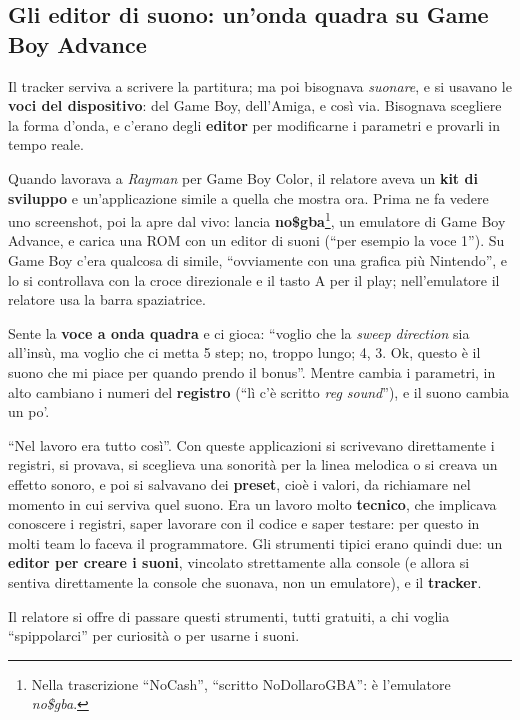 \subsection{Gli editor di suono: un'onda quadra su Game Boy Advance}

Il tracker serviva a scrivere la partitura; ma poi bisognava \emph{suonare}, e si
usavano le \textbf{voci del dispositivo}: del Game Boy, dell'Amiga, e così via.
Bisognava scegliere la forma d'onda, e c'erano degli \textbf{editor} per
modificarne i parametri e provarli in tempo reale.

Quando lavorava a \emph{Rayman} per Game Boy Color, il relatore aveva un
\textbf{kit di sviluppo} e un'applicazione simile a quella che mostra ora. Prima
ne fa vedere uno screenshot, poi la apre dal vivo: lancia
\textbf{no\$gba}\footnote{Nella trascrizione ``NoCash'', ``scritto NoDollaroGBA'':
è l'emulatore \emph{no\$gba}.}, un emulatore di Game Boy Advance, e carica una
ROM con un editor di suoni (``per esempio la voce 1''). Su Game Boy c'era
qualcosa di simile, ``ovviamente con una grafica più Nintendo'', e lo si
controllava con la croce direzionale e il tasto A per il play; nell'emulatore il
relatore usa la barra spaziatrice.

Sente la \textbf{voce a onda quadra} e ci gioca: ``voglio che la \emph{sweep
direction} sia all'insù, ma voglio che ci metta 5 step; no, troppo lungo; 4, 3.
Ok, questo è il suono che mi piace per quando prendo il bonus''. Mentre cambia i
parametri, in alto cambiano i numeri del \textbf{registro} (``lì c'è scritto
\emph{reg sound}''), e il suono cambia un po'.

``Nel lavoro era tutto così''. Con queste applicazioni si scrivevano direttamente
i registri, si provava, si sceglieva una sonorità per la linea melodica o si
creava un effetto sonoro, e poi si salvavano dei \textbf{preset}, cioè i valori,
da richiamare nel momento in cui serviva quel suono. Era un lavoro molto
\textbf{tecnico}, che implicava conoscere i registri, saper lavorare con il codice
e saper testare: per questo in molti team lo faceva il programmatore. Gli
strumenti tipici erano quindi due: un \textbf{editor per creare i suoni},
vincolato strettamente alla console (e allora si sentiva direttamente la console
che suonava, non un emulatore), e il \textbf{tracker}.

Il relatore si offre di passare questi strumenti, tutti gratuiti, a chi voglia
``spippolarci'' per curiosità o per usarne i suoni.


